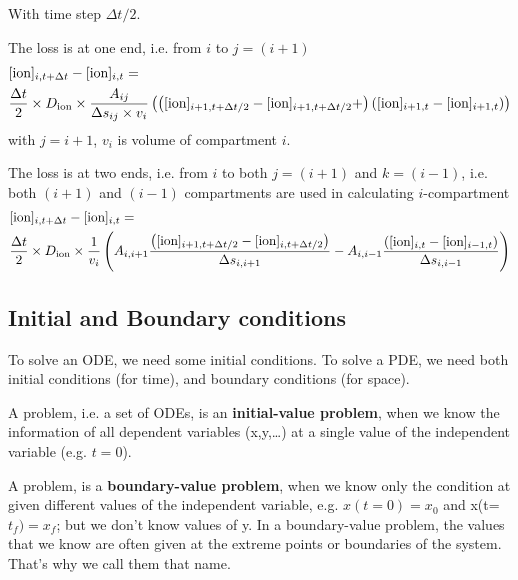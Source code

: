 With time step $\Delta t/2$.

The loss is at one end, i.e. from $i$ to $j=(i+1)$
\begin{equation}
\begin{split}
&[{\text{ion}}]_{i,t+\Delta t} - [{\text{ion}}]_{i,t} =\\
& \frac{\Delta t}{2} \times D_{\text{ion}}
\times \frac{A_{ij}}{\Delta s_{ij} \times v_i} \left(
\left([{\text{ion}}]_{i+1,t+\Delta t/2} - [{\text{ion}}]_{i+1,t+\Delta t/2} +
\right)
\left(
[{\text{ion}}]_{i+1,t} - [{\text{ion}}]_{i+1,t} 
\right)
\right)
\end{split}
\end{equation}
with $j=i+1$, $v_i$ is volume of compartment $i$.

The loss is at two ends, i.e. from $i$ to both $j=(i+1)$ and $k=(i-1)$,
i.e. both $(i+1)$ and $(i-1)$ compartments are used in
calculating $i$-compartment
\begin{equation}
\begin{split}
&[{\text{ion}}]_{i,t+\Delta t} - [{\text{ion}}]_{i,t} =\\
& \frac{\Delta t}{2} \times D_{\text{ion}} \times
\frac{1}{v_i} 
\left(
A_{i,i+1}
\frac{\left([{\text{ion}}]_{i+1,t+\Delta t/2} - [{\text{ion}}]_{i,t+\Delta t/2} 
\right)}{\Delta s_{i,i+1}} -
A_{i,i-1}\frac{\left(
[{\text{ion}}]_{i,t} - [{\text{ion}}]_{i-1,t} 
\right)}{\Delta s_{i,i-1} }
\right)
\end{split}
\end{equation}

\subsection{Initial and Boundary conditions}
\label{sec:init-bound-cond}

To solve an ODE, we need some initial conditions. To solve a PDE, we
need both initial conditions (for time), and boundary conditions (for
space). 

\begin{framed}
A problem, i.e. a set of ODEs, is an {\bf initial-value problem}, when we know
the information of all dependent variables (x,y,\ldots) at a single value of
the independent variable (e.g. $t=0$).

A problem, is a {\bf boundary-value problem}, when we know only the condition at
given different values of the independent variable, e.g. $x(t=0)=x_0$ and
x(t=$t_f)=x_f$; but we don't know values of y. In a boundary-value problem, the
values that we know are often given at the  extreme points or boundaries of the
system. That's why we call them that name.

\end{framed}

